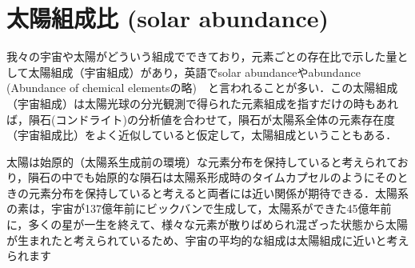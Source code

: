 \section{太陽組成比 (solar abundance)}

我々の宇宙や太陽がどういう組成でできており，元素ごとの存在比で示した量として太陽組成（宇宙組成）があり，英語でsolar abundanceやabundance (Abundance of chemical elementsの略)　と言われることが多い．この太陽組成（宇宙組成）は太陽光球の分光観測で得られた元素組成を指すだけの時もあれば，隕石(コンドライト)の分析値を合わせて，隕石が太陽系全体の元素存在度（宇宙組成比）をよく近似していると仮定して，太陽組成ということもある．

太陽は始原的（太陽系生成前の環境）な元素分布を保持していると考えられており，隕石の中でも始原的な隕石は太陽系形成時のタイムカプセルのようにそのときの元素分布を保持していると考えると両者には近い関係が期待できる．太陽系の素は，宇宙が137億年前にビックバンで生成して，太陽系ができた45億年前に，多くの星が一生を終えて、様々な元素が散りばめられ混ざった状態から太陽が生まれたと考えられているため、宇宙の平均的な組成は太陽組成に近いと考えられます